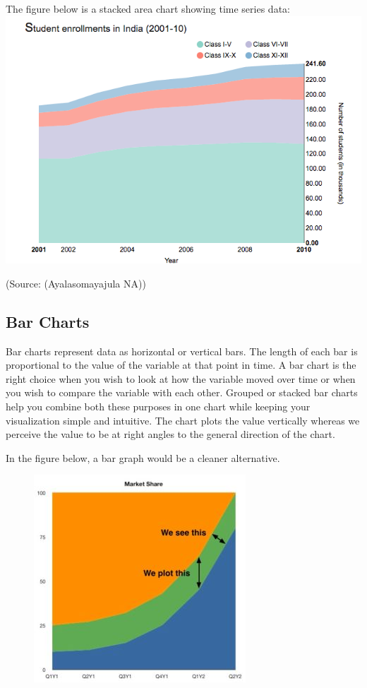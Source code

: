 \documentclass[]{book}
\begin{document}
The figure below is a stacked area chart showing time series data:
\includegraphics{images/aya-stacked.png}

(Source: (Ayalasomayajula NA))

\subsection{Bar Charts}\label{bar-charts}

Bar charts represent data as horizontal or vertical bars. The length of
each bar is proportional to the value of the variable at that point in
time. A bar chart is the right choice when you wish to look at how the
variable moved over time or when you wish to compare the variable with
each other. Grouped or stacked bar charts help you combine both these
purposes in one chart while keeping your visualization simple and
intuitive. The chart plots the value vertically whereas we perceive the
value to be at right angles to the general direction of the chart.

In the figure below, a bar graph would be a cleaner alternative.

\begin{figure}
\centering
\includegraphics{images/aya-stacked-perception.jpg}
\caption{}
\end{figure}
\end{document}
